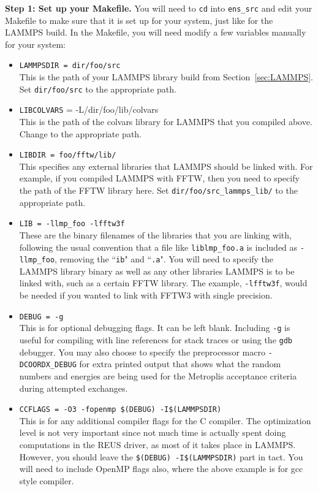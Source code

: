 \documentclass[10pt]{article}
\begin{document}
\textbf{Step 1: Set up your Makefile.}
You will need to \texttt{cd} into \texttt{ens\_src} and edit your Makefile to 
make sure that it is set up for your system, just like for the LAMMPS build.
In the Makefile, you will need modify a few variables manually for your system:
\begin{itemize}
	\item \texttt{LAMMPSDIR = dir/foo/src}\\
		  	This is the path of your LAMMPS library build from Section~\ref{sec:LAMMPS}.
		  	Set \texttt{dir/foo/src} to the appropriate path.
		  
    \item \texttt{LIBCOLVARS} = -L/dir/foo/lib/colvars\\
    		This is the path of the colvars library for LAMMPS that you compiled above.
    		Change to the appropriate path.
		  
	\item \texttt{LIBDIR = foo/fftw/lib/}\\
			This specifies any external libraries that LAMMPS should be linked with. For example,
			if you compiled LAMMPS with FFTW, then you need to specify the path of the FFTW
			library here. Set \texttt{dir/foo/src\_lammps\_lib/} to the appropriate path.
			
	\item \texttt{LIB = -llmp\_foo -lfftw3f}\\
			These are the binary filenames of the libraries that you are linking with, following
			the usual convention that a file like \texttt{liblmp\_foo.a} is included as
			\texttt{-llmp\_foo}, removing the ``\texttt{ib}" and ``\texttt{.a}". You will
			need to specify the LAMMPS library binary as well as any other libraries LAMMPS
			is to be linked with, such as a certain FFTW library. The example, \texttt{-lfftw3f},
			would be needed if you wanted to link with FFTW3 with single precision.	
			
	\item \texttt{DEBUG = -g}\\
			This is for optional debugging flags. It can be left blank. Including \texttt{-g}
			is useful for compiling with line references for stack traces or using the 
			\texttt{gdb} debugger. You may also choose to specify the preprocessor macro
			\texttt{-DCOORDX\_DEBUG} for extra printed output that shows what the random
			numbers and energies are being used for the Metroplis acceptance criteria
			during attempted exchanges.
			
	\item \texttt{CCFLAGS = -O3 -fopenmp \$(DEBUG) -I\$(LAMMPSDIR)}\\
			This is for any additional compiler flags for the C compiler. The optimization
			level is not very important since not much time is actually spent doing computations
			in the REUS driver, as most of it takes place in LAMMPS. However, you should
			leave the \texttt{\$(DEBUG) -I\$(LAMMPSDIR)} part in tact. You will need to include
			OpenMP flags also, where the above example is for gcc style compiler.
			
\end{itemize}
\end{document}
